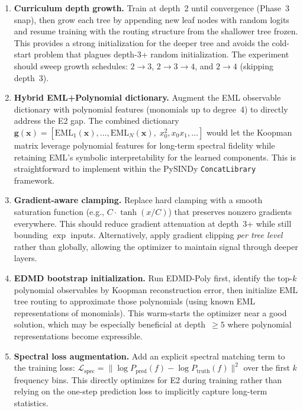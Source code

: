 \documentclass[11pt]{article}
\newcommand{\bx}{\mathbf{x}}
\newcommand{\bg}{\mathbf{g}}
\newcommand{\cL}{\mathcal{L}}
\begin{document}
\begin{enumerate}
  \item \textbf{Curriculum depth growth.}  Train at depth~2 until convergence
    (Phase~3 snap), then grow each tree by appending new leaf nodes with random
    logits and resume training with the routing structure from the shallower
    tree frozen.  This provides a strong initialization for the deeper tree
    and avoids the cold-start problem that plagues depth-3+ random
    initialization.  The experiment should sweep growth schedules:
    $2 \to 3$, $2 \to 3 \to 4$, and $2 \to 4$ (skipping depth~3).

  \item \textbf{Hybrid EML+Polynomial dictionary.}  Augment the EML observable
    dictionary with polynomial features (monomials up to degree~4) to directly
    address the E2 gap.  The combined dictionary
    $\bg(\bx) = [\text{EML}_1(\bx), \ldots, \text{EML}_N(\bx),\;
    x_0^2, x_0 x_1, \ldots]$ would let the Koopman matrix leverage polynomial
    features for long-term spectral fidelity while retaining EML's symbolic
    interpretability for the learned components.  This is straightforward to
    implement within the PySINDy \texttt{ConcatLibrary} framework.

  \item \textbf{Gradient-aware clamping.}  Replace hard clamping with a smooth
    saturation function (e.g., $C \cdot \tanh(x/C)$) that preserves nonzero
    gradients everywhere.  This should reduce gradient attenuation at depth~3+
    while still bounding $\exp$ inputs.  Alternatively, apply gradient clipping
    \emph{per tree level} rather than globally, allowing the optimizer to
    maintain signal through deeper layers.

  \item \textbf{EDMD bootstrap initialization.}  Run EDMD-Poly first, identify
    the top-$k$ polynomial observables by Koopman reconstruction error, then
    initialize EML tree routing to approximate those polynomials (using known
    EML representations of monomials).  This warm-starts the optimizer near a
    good solution, which may be especially beneficial at depth~$\ge 5$ where
    polynomial representations become expressible.

  \item \textbf{Spectral loss augmentation.}  Add an explicit spectral matching
    term to the training loss:
    $\cL_{\text{spec}} = \|\log P_{\text{pred}}(f) - \log P_{\text{truth}}(f)\|^2$
    over the first $k$ frequency bins.  This directly optimizes for E2 during
    training rather than relying on the one-step prediction loss to implicitly
    capture long-term statistics.


\end{enumerate}
\end{document}
